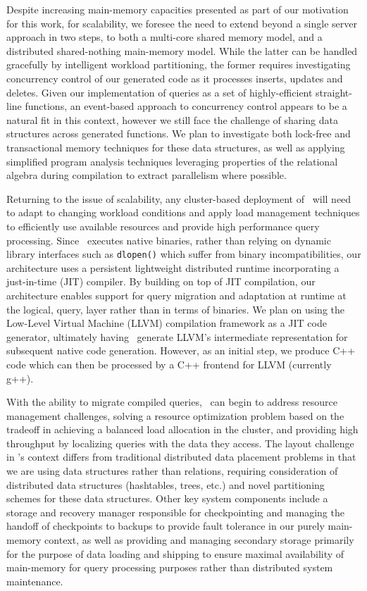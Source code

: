 Despite increasing main-memory capacities presented as part of our motivation for
this work, for scalability, we foresee the need to extend beyond a single server
approach in two steps, to both a multi-core shared memory model, and a
distributed shared-nothing main-memory model. While the latter can be handled
gracefully by intelligent workload partitioning, the former requires
investigating concurrency control of our generated code as it processes inserts,
updates and deletes. Given our implementation of queries as a set of
highly-efficient straight-line functions, an event-based approach to concurrency
control appears to be a natural fit in this context, however we still face the
challenge of sharing data structures across generated functions. We plan to
investigate both lock-free and transactional memory techniques for these data
structures, as well as applying simplified program analysis techniques leveraging
properties of the relational algebra during compilation to extract parallelism
where possible.

Returning to the issue of scalability, any cluster-based deployment of \compiler\
will need to adapt to changing workload conditions and apply load management
techniques to efficiently use available resources and provide high performance
query processing. Since \compiler\ executes native binaries, rather than relying
on dynamic library interfaces such as \texttt{dlopen()} which suffer from binary
incompatibilities, our architecture uses a persistent lightweight distributed
runtime incorporating a just-in-time (JIT) compiler. By building on top of JIT
compilation, our architecture enables support for query migration and adaptation
at runtime at the logical, query, layer rather than in terms of binaries. We plan
on using the Low-Level Virtual Machine (LLVM) compilation framework as a JIT code
generator, ultimately having \compiler\ generate LLVM's intermediate
representation for subsequent native code generation. However, as an initial
step, we produce C++ code which can then be processed by a C++ frontend for
LLVM (currently g++).

With the ability to migrate compiled queries, \compiler\ can begin to address
resource management challenges, solving a resource optimization problem based on
the tradeoff in achieving a balanced load allocation in the cluster, and
providing high throughput by localizing queries with the data they access. The
layout challenge in \compiler's context differs from traditional distributed data
placement problems in that we are using data structures rather than relations,
requiring consideration of distributed data structures (hashtables, trees, etc.)
and novel partitioning schemes for these data structures.
Other key system components include a storage and recovery manager responsible
for checkpointing and managing the handoff of checkpoints to backups to provide
fault tolerance in our purely main-memory context, as well as providing and
managing secondary storage primarily for the purpose of data loading and shipping
to ensure maximal availability of main-memory for query processing purposes
rather than distributed system maintenance.

